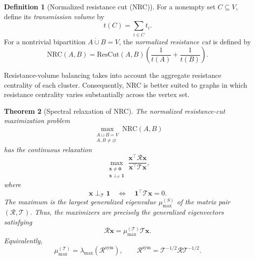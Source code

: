 \documentclass[12pt,a4paper]{amsart}
\newtheorem{theorem}{Theorem}[section]
\theoremstyle{remark}
\theoremstyle{definition}
\newtheorem{definition}[theorem]{Definition}
\newcommand{\Rs}{\mathcal{R}}
\newcommand{\1}{\mathbf{1}}
\newcommand{\0}{\mathbf{0}}
\newcommand{\bx}{\mathbf{x}}
\begin{document}
	\begin{definition}[Normalized resistance cut (NRC)]
For a nonempty set $C\subseteq V$, define its
\emph{transmission volume} by
\[
t(C)=\sum_{i\in C}t_i.
\]
For a nontrivial bipartition
$A\mathbin{\dot\cup}B=V$, the \emph{normalized resistance cut} is
defined by
\[
\mathrm{NRC}(A,B)
=
\mathrm{ResCut}(A,B)
\left(
\frac{1}{t(A)}+\frac{1}{t(B)}
\right).
\]
\end{definition}
Resistance-volume balancing takes into account the aggregate resistance centrality of each cluster. 
Consequently, NRC is better suited to graphs in which resistance centrality varies substantially across the vertex set.    
	\begin{theorem}[Spectral relaxation of NRC]
\label{thm:nrc}
The normalized resistance-cut maximization problem
\[
\max_{\substack{A\sqcup B=V\\A,B\neq\varnothing}}
\mathrm{NRC}(A,B)
\]
has the continuous relaxation
\[
\max_{\substack{\bx\neq\mathbf{0}\\
\bx\perp_{\mathcal{T}}\mathbf{1}}}
\frac{\bx^\top\Rs\bx}{\bx^\top \mathcal{T}\bx},
\]
where
\[
\bx\perp_{\mathcal{T}}\mathbf{1}
\quad\Longleftrightarrow\quad
\mathbf{1}^\top \mathcal{T}\bx=0.
\]
The maximum is the largest generalized eigenvalue
$\mu_{\max}^{(S)}$ of the matrix pair $(\Rs,\mathcal{T})$. Thus, the
maximizers are precisely the generalized eigenvectors satisfying
\[
\Rs\bx=\mu_{\max}^{(\mathcal{T})}\mathcal{T}\bx.
\]
Equivalently,
\[
\mu_{\max}^{(\mathcal{T})}
=
\lambda_{\max}\!\left(\Rs^{\mathrm{sym}}\right),
\qquad
\Rs^{\mathrm{sym}}
=
\mathcal{T}^{-1/2}\Rs \mathcal{T}^{-1/2}.
\]
\end{theorem}
\end{document}

